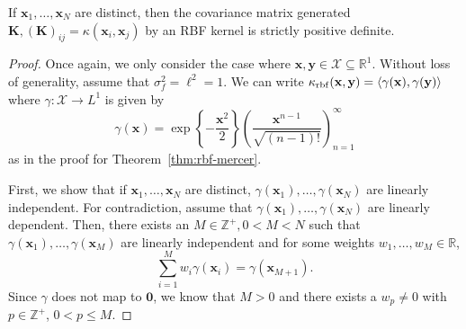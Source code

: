 \begin{lemma}
    \label{lem:rbf-pd}
    If $\mathbf{x}_1, \dots, \mathbf{x}_N$ are distinct, then the covariance matrix generated $\mathbf{K}, (\mathbf{K})_{ij} = \kappa(\mathbf{x}_i, \mathbf{x}_j)$ by an RBF kernel is strictly positive definite.
\end{lemma}
\begin{proof}
    Once again, we only consider the case where $\mathbf{x}, \mathbf{y} \in \mathcal{X} \subseteq \mathbb{R}^{1}$.
    Without loss of generality, assume that $\sigma_f^2 = \ell^2 = 1$.
    We can write $\kappa_{\mathrm{rbf}}(\mathbf{x}, \mathbf{y}) = \langle \gamma(\mathbf{x}), \gamma(\mathbf{y}) \rangle$
    where $\gamma: \mathcal{X} \to L^{1}$ is given by
    \begin{equation*}
        \gamma(\mathbf{x}) = \exp\left\{-\frac{\mathbf{x}^2}2 \right\} \left(\frac{ \mathbf{x}^{n - 1} }{ \sqrt{(n - 1)!} }\right)_{n=1}^{\infty}
    \end{equation*}
    as in the proof for Theorem~\ref{thm:rbf-mercer}.

    First, we show that if $\mathbf{x}_1, \dots, \mathbf{x}_N$ are distinct, $\gamma(\mathbf{x}_1), \dots, \gamma(\mathbf{x}_N)$ are linearly independent.
    For contradiction, assume that $\gamma(\mathbf{x}_1), \dots, \gamma(\mathbf{x}_N)$ are linearly dependent.
    Then, there exists an $M \in \mathbb{Z}^{+}, 0 < M < N$ such that $\gamma(\mathbf{x}_1), \dots, \gamma(\mathbf{x}_M)$
    are linearly independent and for some weights $w_1, \dots, w_M \in \mathbb{R}$,
    \begin{equation}
        \label{eq:dep}
        \sum_{i = 1}^{M}w_i \gamma(\mathbf{x}_i)  = \gamma(\mathbf{x}_{M + 1}).
    \end{equation}
    Since $\gamma$ does not map to $\mathbf{0}$, we know that $M > 0$ and there exists a $w_p \neq 0$ with $p \in \mathbb{Z}^{+}$, $0 < p \leq M$.


\end{proof}
